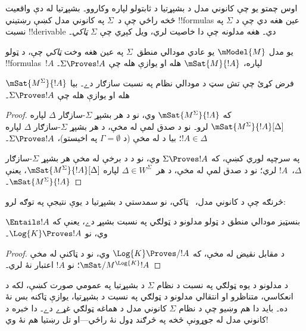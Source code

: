 \documentclass[../../../include/open-logic-section]{subfiles}
\begin{document}


اوس چمتو يو چې کانوني مدل د بشپړتيا د ثابتولو لپاره وکاروو۔ بشپړتيا له دې واقعيت څخه
راځي چې د~$\Sigma$ په کانوني مدل کښې رښتيني !!{formula}s عين هغه دي چې
د $\Sigma$ په نسبت !!{derivable} دي۔ هغه مدلونه چې دا خاصيت لري، ويل کېږي چې
$\Sigma$ \emph{ټاکي}۔

\begin{defn}
  يو مدل $\mModel{M}$ يو عادي مودالي منطق~$\Sigma$ په عين هغه وخت
  \emph{ټاکي} چې، د ټولو !!{formula}s~$!A$ لپاره، $\mSat{M}{!A}$ هله او يوازې هله
  چې $\Sigma \Proves !A$۔
\end{defn}

\begin{thm}[ټاکنه]
   فرض کړئ چې تش سټ د مودالي نظام په نسبت سازګار دے۔ بيا
   $\mSat{M^\Sigma}{!A}$ هله او يوازې هله چې $\Sigma \Proves !A$۔
\end{thm}

\begin{proof}
  که $\mSat{M^\Sigma}{!A}$ وي، نو د هر بشپړ
  $\Sigma$-سازګار $\Delta$ لپاره
  $\mSat{M^\Sigma}{!A}[\Delta]$ لرو۔ نو د صدق لمې له مخې، د
  هر بشپړ $\Sigma$-سازګار $\Delta$ لپاره $!A \in
  \Delta$؛ بيا د  له مخې (د $\Gamma =
  \emptyset$ په اخيستو)، $\Sigma \Proves !A$۔

  په سرچپه لوري کښې، که $\Sigma \Proves !A$ وي، نو د
   د  برخې له مخې هر
  بشپړ $\Sigma$-سازګار $\Delta$،~$!A$ لري؛ نو د
  صدق لمې له مخې، د هر~$\Delta \in W^\Sigma$ لپاره
  $\mSat{M^\Sigma}{!A}[\Delta]$، يعنې $\mSat{M^\Sigma}{!A}$۔
\end{proof}

څرنګه چې د  کانوني مدل،~ ټاکي، نو سمدستي
د  بشپړتيا د يوې نتيجې په توګه لرو:

\begin{cor}
  بنسټيز مودالي منطق  د ټولو مدلونو د ټولګي په نسبت
  بشپړ دے، يعنې که $\Entails !A$ وي، نو $\Log{K}
  \Proves !A$۔
\end{cor}

\begin{proof}
  د مقابل نقيض له مخې، که $\Log{K} \Proves/ !A$ وي، نو د ټاکنې له مخې
  $\mSat/{M^{\Log{K}}}{!A}$؛ نو $!A$ اعتبار نۀ لري۔
\end{proof}

د مدلونو د يوه ټولګي په نسبت د نظام $\Sigma$ د بشپړتيا په عمومي صورت کښې،
لکه د انعکاسي، متناظرو او انتقالي مدلونو د ټولګي په نسبت د  بشپړتيا،
يوازې ټاکنه بس نۀ ده۔ بايد دا هم وښيو چې د نظام
$\Sigma$ کانوني مدل د هماغه ټولګي غړے دے۔ دا خبره د کانوني مدل له جوړونې څخه
په څرګند ډول نۀ راځي---او تل رښتيا هم نۀ وي!
\end{document}
